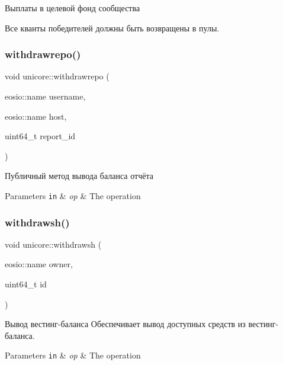 Выплаты в целевой фонд сообщества

Все кванты победителей должны быть возвращены в пулы.\mbox{\label{classunicore_a9c8a515eef8e3dd262372da54945047b}} 
\subsubsection{\texorpdfstring{withdrawrepo()}{withdrawrepo()}}
{\footnotesize\ttfamily void unicore\+::withdrawrepo (\begin{DoxyParamCaption}\item[{eosio\+::name}]{username,  }\item[{eosio\+::name}]{host,  }\item[{uint64\+\_\+t}]{report\+\_\+id }\end{DoxyParamCaption})}



Публичный метод вывода баланса отчёта 


\begin{DoxyParams}[1]{Parameters}
\mbox{\tt in}  & {\em op} & The operation \\
\hline
\end{DoxyParams}
\mbox{\label{classunicore_a4dd6d244c3fac428419342dc782f53a1}} 
\subsubsection{\texorpdfstring{withdrawsh()}{withdrawsh()}}
{\footnotesize\ttfamily void unicore\+::withdrawsh (\begin{DoxyParamCaption}\item[{eosio\+::name}]{owner,  }\item[{uint64\+\_\+t}]{id }\end{DoxyParamCaption})}



Вывод вестинг-\/баланса Обеспечивает вывод доступных средств из вестинг-\/баланса. 


\begin{DoxyParams}[1]{Parameters}
\mbox{\tt in}  & {\em op} & The operation \\
\hline
\end{DoxyParams}


